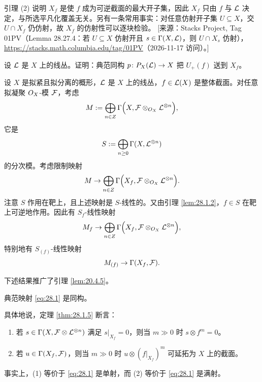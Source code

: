 \begin{yizhu}
引理 (2) 说明 $X_f$ 是使 $f$ 成为可逆截面的最大开子集，因此 $X_f$ 只由 $f$ 与 $\mathcal{L}$ 决定，与所选平凡化覆盖无关。另有一条常用事实：对任意仿射开子集 $U\subseteq X$，交 $U\cap X_f$ 仍仿射，故 $X_f$ 的仿射性可以逐块检验。
[来源：Stacks Project, Tag 01PV（Lemma 28.27.4：若 $U\subseteq X$ 仿射开且 $s\in\Gamma(X,\mathcal{L})$，则 $U\cap X_s$ 仿射），\url{https://stacks.math.columbia.edu/tag/01PV}（2026-11-17 访问）。]
\end{yizhu}

\begin{exercise}\label{exc:28.1.3}
设 $\mathcal{L}$ 是 $X$ 上的线丛。证明：典范同构 $p\colon P_X(\mathcal{L})\to X$ 把 $U_+(f)$ 送到 $X_f$。
\end{exercise}

\begin{construction}\label{con:28.1.4}
设 $X$ 是拟紧且拟分离的概形，$\mathcal{L}$ 是 $X$ 上的线丛，$f\in\mathcal{L}(X)$ 是整体截面。对任意拟凝聚 $O_X$-模 $\mathcal{F}$，考虑
\[
M := \bigoplus_{n\in Z}\Gamma\Bigl(X,\mathcal{F}\otimes_{O_X}\mathcal{L}^{\otimes n}\Bigr),
\]
它是
\[
S := \bigoplus_{n\ge 0}\Gamma(X,\mathcal{L}^{\otimes n})
\]
的分次模。考虑限制映射
\[
M \to \bigoplus_{n\in Z}\Gamma\Bigl(X_f,\mathcal{F}\otimes_{O_X}\mathcal{L}^{\otimes n}\Bigr).
\]
注意 $S$ 作用在靶上，且上述映射是 $S$-线性的。又由引理 \ref{lem:28.1.2}，$f\in S$ 在靶上可逆地作用。因此有 $S_f$-线性映射
\[
M_f \to \bigoplus_{n\in Z}\Gamma\Bigl(X_f,\mathcal{F}\otimes_{O_X}\mathcal{L}^{\otimes n}\Bigr),
\]
特别地有 $S_{(f)}$-线性映射
\begin{equation}
M_{(f)} \to \Gamma(X_f,\mathcal{F}). \label{eq:28.1}
\end{equation}
\end{construction}

下述结果推广了引理 \ref{lem:20.4.5}。

\begin{theorem}\label{thm:28.1.5}
典范映射 \eqref{eq:28.1} 是同构。
\end{theorem}

\begin{remark}\label{rem:28.1.6}
具体地说，定理 \ref{thm:28.1.5} 断言：
\begin{enumerate}[label=(\arabic*),leftmargin=2.4em,itemsep=0.25ex]
  \item 若 $s\in\Gamma(X,\mathcal{F}\otimes\mathcal{L}^{\otimes n})$ 满足 $s|_{X_f}=0$，则当 $m\gg 0$ 时 $s\otimes f^m=0$。
  \item 若 $u\in\Gamma(X_f,\mathcal{F})$，则当 $m\gg 0$ 时 $u\otimes (f|_{X_f})^m$ 可延拓为 $X$ 上的截面。
\end{enumerate}
事实上，(1) 等价于 \eqref{eq:28.1} 是单射，而 (2) 等价于 \eqref{eq:28.1} 是满射。
\end{remark}

